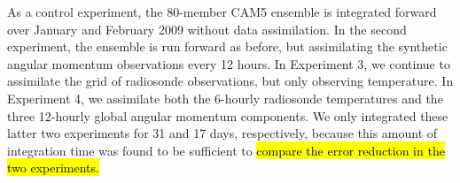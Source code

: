 As a control experiment, the 80-member CAM5 ensemble is integrated forward over January and February 2009 without data assimilation. 
In the second experiment, the ensemble is run forward as before, but assimilating the synthetic angular momentum observations every 12 hours.
In Experiment 3, we continue to assimilate the grid of radiosonde observations, but only observing temperature.
In Experiment 4, we assimilate both the 6-hourly radiosonde temperatures and the three 12-hourly global angular momentum components.
We only integrated these latter two experiments for 31 and 17 days, respectively, because this amount of integration time was found to be sufficient to \hl{compare the error reduction in the two experiments.} 




